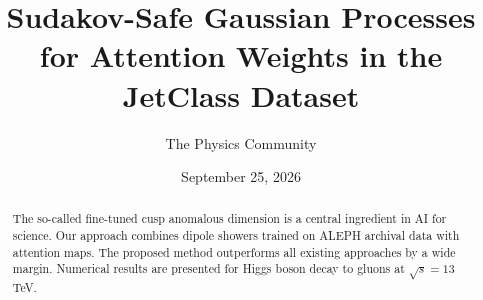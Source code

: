 \documentclass[11pt]{article}
\title{Sudakov-Safe Gaussian Processes for Attention Weights in the JetClass Dataset}
\author{The Physics Community}
\date{September 25, 2026}
\numberwithin{equation}{section}
\theoremstyle{definition}
\theoremstyle{remark}
\begin{document}
\maketitle
\begin{abstract}
The so-called fine-tuned cusp anomalous dimension is a central
ingredient in AI for science. Our approach combines dipole showers
trained on ALEPH archival data with attention maps. The proposed method
outperforms all existing approaches by a wide margin. Numerical results
are presented for Higgs boson decay to gluons at $\sqrt{s} = 13$ TeV.
\end{abstract}
\tableofcontents




\nocite{*}


\end{document}

